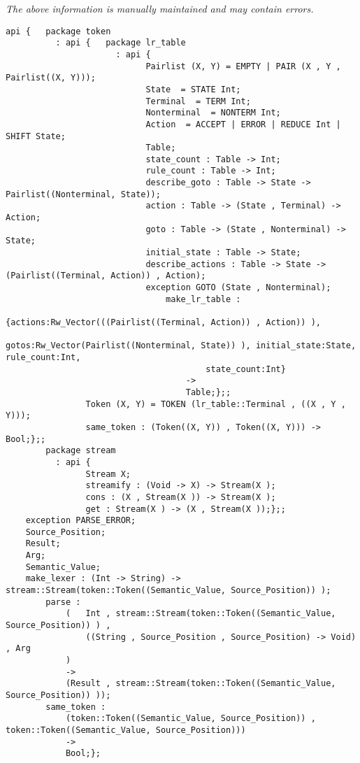\label{api:Parser}

{\tiny \it The above information is manually maintained and may contain errors.}
\begin{verbatim}
api {   package token
          : api {   package lr_table
                      : api {
                            Pairlist (X, Y) = EMPTY | PAIR (X , Y , Pairlist((X, Y)));
                            State  = STATE Int;
                            Terminal  = TERM Int;
                            Nonterminal  = NONTERM Int;
                            Action  = ACCEPT | ERROR | REDUCE Int | SHIFT State;
                            Table;
                            state_count : Table -> Int;
                            rule_count : Table -> Int;
                            describe_goto : Table -> State -> Pairlist((Nonterminal, State));
                            action : Table -> (State , Terminal) -> Action;
                            goto : Table -> (State , Nonterminal) -> State;
                            initial_state : Table -> State;
                            describe_actions : Table -> State -> (Pairlist((Terminal, Action)) , Action);
                            exception GOTO (State , Nonterminal);
                                make_lr_table :
                                        {actions:Rw_Vector(((Pairlist((Terminal, Action)) , Action)) ),
                                        gotos:Rw_Vector(Pairlist((Nonterminal, State)) ), initial_state:State, rule_count:Int,
                                        state_count:Int}
                                    ->
                                    Table;};;
                Token (X, Y) = TOKEN (lr_table::Terminal , ((X , Y , Y)));
                same_token : (Token((X, Y)) , Token((X, Y))) -> Bool;};;
        package stream
          : api {
                Stream X;
                streamify : (Void -> X) -> Stream(X );
                cons : (X , Stream(X )) -> Stream(X );
                get : Stream(X ) -> (X , Stream(X ));};;
    exception PARSE_ERROR;
    Source_Position;
    Result;
    Arg;
    Semantic_Value;
    make_lexer : (Int -> String) -> stream::Stream(token::Token((Semantic_Value, Source_Position)) );
        parse :
            (   Int , stream::Stream(token::Token((Semantic_Value, Source_Position)) ) ,
                ((String , Source_Position , Source_Position) -> Void) , Arg
            )
            ->
            (Result , stream::Stream(token::Token((Semantic_Value, Source_Position)) ));
        same_token :
            (token::Token((Semantic_Value, Source_Position)) , token::Token((Semantic_Value, Source_Position)))
            ->
            Bool;};
\end{verbatim}
